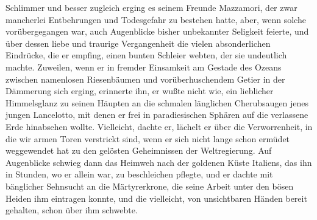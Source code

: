 Schlimmer und besser zugleich erging es seinem Freunde Mazzamori,
der zwar mancherlei Entbehrungen und Todesgefahr zu bestehen hatte,
aber, wenn solche vorübergegangen war, auch Augenblicke bisher
unbekannter Seligkeit feierte, \pagenum{[91]} und über dessen liebe
und traurige Vergangenheit die vielen absonderlichen Eindrücke, die
er empfing, einen bunten Schleier webten, der sie undeutlich
machte. Zuweilen, wenn er in fremder Einsamkeit am Gestade des
Ozeans zwischen namenlosen Riesenbäumen und vorüberhuschendem
Getier in der Dämmerung sich erging, erinnerte ihn, er wußte nicht
wie, ein lieblicher Himmelsglanz zu seinen Häupten an die schmalen
länglichen Cherubsaugen jenes jungen Lancelotto, mit denen er frei
in paradiesischen Sphären auf die verlassene Erde hinabsehen
wollte. Vielleicht, dachte er, lächelt er über die Verworrenheit,
in die wir armen Toren verstrickt sind, wenn er sich nicht lange
schon ermüdet weggewendet hat zu den gelösten Geheimnissen der
Weltregierung. Auf Augenblicke schwieg dann das Heimweh nach der
goldenen Küste Italiens, das ihn in Stunden, wo er allein war, zu
beschleichen pflegte, und er dachte mit bänglicher Sehnsucht an die
Märtyrerkrone, die seine Arbeit unter den bösen Heiden ihm
eintragen konnte, und die vielleicht, von unsichtbaren Händen
bereit gehalten, schon über ihm schwebte.



